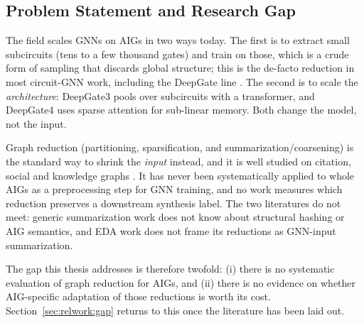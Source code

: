 \subsection{Problem Statement and Research Gap}
\label{sec:intro:gap}
The field scales GNNs on AIGs in two ways today. The first is to extract small
subcircuits (tens to a few thousand gates) and train on those, which is a crude form of
sampling that discards global structure; this is the de-facto reduction in most
circuit-GNN work, including the DeepGate line \citep{li2022deepgate}. The second is to
scale the \emph{architecture}: DeepGate3 \citep{shi2024deepgate3} pools over subcircuits
with a transformer, and DeepGate4 \citep{deepgate4_2025} uses sparse attention for
sub-linear memory. Both change the model, not the input.

Graph reduction (partitioning, sparsification, and summarization/coarsening) is the
standard way to shrink the \emph{input} instead, and it is well studied on citation,
social and knowledge graphs \citep{hashemi2024survey}. It has never been systematically
applied to whole AIGs as a preprocessing step for GNN training, and no work measures which
reduction preserves a downstream synthesis label. The two literatures do not meet: generic
summarization work \citep{bollen2023exact,generale2022scaling,loukas2019localvariation}
does not know about structural hashing or AIG semantics, and EDA work
\citep{mishchenko2005fraig,li2022deepgate} does not frame its reductions as GNN-input
summarization.

The gap this thesis addresses is therefore twofold: (i) there is no systematic evaluation
of graph reduction for AIGs, and (ii) there is no evidence on whether AIG-specific
adaptation of those reductions is worth its cost. Section~\ref{sec:relwork:gap} returns to
this once the literature has been laid out.


